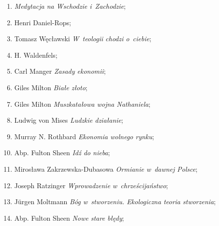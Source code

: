 \documentclass[a4paper,11pt]{article}
\begin{document}
\begin{enumerate}
\item \textit{Medytacja na Wschodzie i~Zachodzie};



\item Henri Daniel-Rops;



\item Tomasz Węcławski \textit{W~teologii chodzi o~ciebie};



\item H. Waldenfels;



\item Carl Manger \textit{Zasady ekonomii};



\item Giles Milton \textit{Białe złoto};



\item Giles Milton \textit{Muszkatałowa wojna Nathaniela};



\item Ludwig von Mises \textit{Ludzkie działanie};



\item Murray N. Rothbard \textit{Ekonomia wolnego rynku};



\item Abp. Fulton Sheen \textit{Idź do nieba};



\item Mirosława Zakrzewska-Dubasowa \textit{Ormianie w~dawnej Polsce};



\item Joseph Ratzinger \textit{Wprowadzenie w~chrześcijaństwo};



\item J\"{u}rgen Moltmann \textit{Bóg w~stworzeniu. Ekologiczna teoria
    stworzenia};



\item Abp. Fulton Sheen \textit{Nowe stare błędy};

\end{enumerate}
\end{document}
